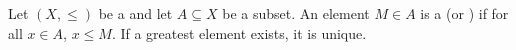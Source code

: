 \begin{definition} \label{definition:greatest_element_in_a_subset_of_a_partially_ordered_set}
Let $(X, \leq)$ be a  and let $A \subseteq X$ be a subset. An element $M \in A$ is a  (or ) if for all $x \in A$, $x \leq M$. If a greatest element exists, it is unique.
\end{definition}
